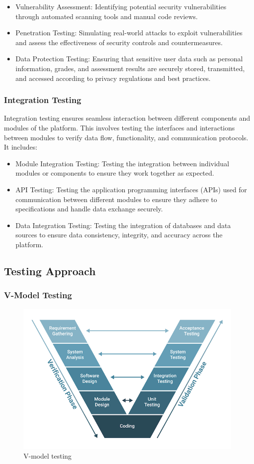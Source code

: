 		\begin{itemize}
			\item Vulnerability Assessment: Identifying potential security vulnerabilities through automated scanning tools and manual code reviews.
			\item Penetration Testing: Simulating real-world attacks to exploit vulnerabilities and assess the effectiveness of security controls and countermeasures.
			\item Data Protection Testing: Ensuring that sensitive user data such as personal information, grades, and assessment results are securely stored, transmitted, and accessed according to privacy regulations and best practices.
		\end{itemize}
		
		\subsubsection{Integration Testing}
		
		Integration testing ensures seamless interaction between different components and modules of the platform. This involves testing the interfaces and interactions between modules to verify data flow, functionality, and communication protocols. It includes:
		
		\begin{itemize}
			\item Module Integration Testing: Testing the integration between individual modules or components to ensure they work together as expected.
			\item API Testing: Testing the application programming interfaces (APIs) used for communication between different modules to ensure they adhere to specifications and handle data exchange securely.
			\item Data Integration Testing: Testing the integration of databases and data sources to ensure data consistency, integrity, and accuracy across the platform.
		\end{itemize}
		
	\subsection{Testing Approach}

		\subsubsection{V-Model Testing}

		\begin{figure}[H]
			\centering
			\includegraphics[width=0.55\linewidth]{images/v-model-testing.png}
			\caption{V-model testing}
			\label{fig:v-model-testing}
		\end{figure}

